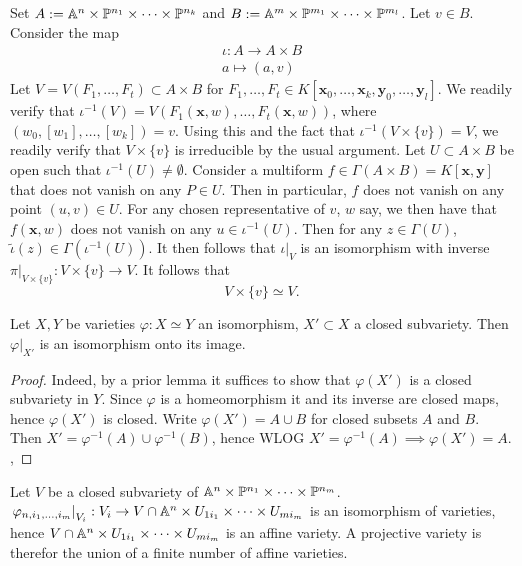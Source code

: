     \begin{example}
        Set $A:=\mathbb{A}^n\times \mathbb{P}^{n_1}\times \cdots \times \mathbb{P}^{n_k}$ and $B:= \mathbb{A}^m\times \mathbb{P}^{m_1}\times \cdots \times \mathbb{P}^{m_l}$. Let $v\in B$. Consider the map 
        \begin{gather*}
            \iota : A\rightarrow A\times B\\
            a\mapsto (a,v)
        \end{gather*}
        Let $V=V(F_1,\dots,F_t)\subset A\times B$ for $F_1,\dots,F_t\in K[\mathbf{x}_0,\dots,\mathbf{x}_k,\mathbf{y}_0,\dots,\mathbf{y}_l]$. We readily verify that $\iota^{-1}(V)=V(F_1(\mathbf{x},w),\dots,F_t(\mathbf{x},w))$, where $(w_0,[w_1],\dots,[w_k])=v$. Using this and the fact that $\iota^{-1}(V\times \{v\})=V$, we readily verify that $V\times \{v\}$ is irreducible by the usual argument. Let $U\subset A\times B$ be open such that $\iota^{-1}(U)\neq \emptyset$. Consider a multiform $f\in \Gamma(A\times B)= K[\mathbf{x},\mathbf{y}]$ that does not vanish on any $P\in U$. Then in particular, $f$ does not vanish on any point $(u,v)\in U$. For any chosen representative of $v$, $w$ say, we then have that $f(\mathbf{x},w)$ does not vanish on any $u\in \iota^{-1}(U)$. Then for any $z\in \Gamma(U)$, $\widetilde{\iota}(z)\in \Gamma\left(\iota^{-1}(U)\right)$.  
        It then follows that $\left.\iota\right|_{V}$ is an isomorphism with inverse $\left.\pi\right|_{V\times \{v\}}: V\times \{v\}  \rightarrow V$. It follows that 
        $$V\times \{v\} \simeq V.$$
    \end{example}
    \begin{lemma}\label{RestrictionOfIsomorphismToClosedSubvarietyIsIsomorphism}
        Let $X,Y$ be varieties $\varphi : X\simeq Y$ an isomorphism, $X'\subset X$ a closed subvariety. Then $\left.\varphi\right|_{X'}$ is an isomorphism onto its image. 
    \end{lemma}
    \begin{proof}
        Indeed, by a prior lemma it suffices to show that $\varphi(X')$ is a closed subvariety in $Y$. Since $\varphi$ is a homeomorphism it and its inverse are closed maps, hence $\varphi(X')$ is closed. Write $\varphi(X')=A\cup B$ for closed subsets $A$ and $B$. Then $X' = \varphi^{-1}(A)\cup\varphi^{-1}(B)$, hence WLOG $X'=\varphi^{-1}(A)\implies \varphi(X')=A.$,  
    \end{proof}
    \begin{proposition}
        Let $V$ be a closed subvariety of $\mathbb{A}^n\times\mathbb{P}^{n_1}\times \cdots \times \mathbb{P}^{n_m}$. $\left.\varphi_{n,i_1,\dots,i_m}\right|_{V_i}:V_i\rightarrow V\cap \mathbb{A}^n\times U_{1i_1}\times \cdots \times U_{mi_m}$ is an isomorphism of varieties, hence $V\cap \mathbb{A}^n\times U_{1i_1}\times \cdots \times U_{mi_m}$ is an affine variety. A projective variety is therefor the union of a finite number of affine varieties. 
    \end{proposition}

